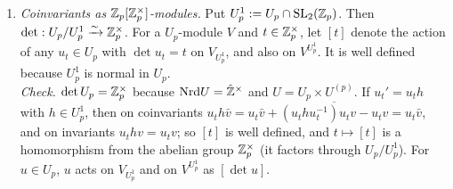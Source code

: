 \begin{enumerate}[label=(C\arabic*)]
  $r$; $\Nrd u\in\Zhat^\times$ only changes $t$, by $\Nrd u$, whose $p$-component is $\det(u_p)$; the idele $\Nrd\alpha$ is $q$ at $q$ and $1$
  elsewhere, $=q\cdot t$ with $t$ equal to $q^{-1}$ at every prime $\ne q$; likewise for $g$ at $\ell$ (more generally
  $\tau(xg)=\ell^{-m}\tau(x)$ if $\Nrd g\in\ell^m\Z_\ell^\times$ at $\ell$ and $g$ is $1$ elsewhere). The equivalent form: $\|a\|=r_a^{-1}$, and
  $a_p=r_a(t_a)_p$. \stproved
\item \emph{Coinvariants as $\mathbb{Z}_p[\mathbb{Z}_p^\times]$-modules.} Put $U_p^1:=U_p\cap\mathrm{SL}_2(\mathbb{Z}_p)$. Then $\det:U_p/U_p^1\xrightarrow\sim\mathbb{Z}_p^\times$.
  For a $U_p$-module $V$ and $t\in\mathbb{Z}_p^\times$, let $[t]$ denote the action of any $u_t\in U_p$ with $\det u_t=t$ on
  $V_{U^1_p}$, and also on $V^{U^1_p}$. It is well defined because $U^1_p$ is normal in $U_p$.\\
  \emph{Check.} $\det U_p=\mathbb{Z}_p^\times$ because $\mathrm{Nrd} U=\hat{\mathbb{Z}}^\times$ and $U=U_p\times U^{(p)}$. If $u_t'=u_th$ with $h\in U^1_p$, then on
  coinvariants $u_th\bar v=u_t\bar v+\overline{(u_thu_t^{-1})u_tv-u_tv}=u_t\bar v$, and on invariants $u_thv=u_tv$; so $[t]$ is well defined, and
  $t\mapsto[t]$ is a homomorphism from the abelian group $\mathbb{Z}_p^\times$ (it factors through $U_p/U^1_p$). For $u\in U_p$, $u$ acts on $V_{U^1_p}$ and on
  $V^{U^1_p}$ as $[\det u]$. \stproved
\end{enumerate}

